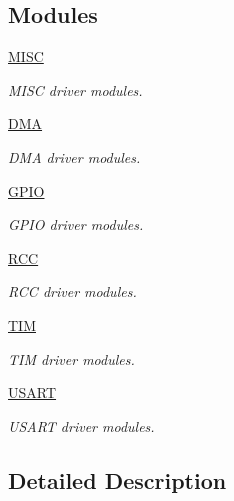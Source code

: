 \subsection*{Modules}
\begin{DoxyCompactItemize}
\item 
\hyperlink{group___m_i_s_c}{M\+I\+SC}
\begin{DoxyCompactList}\small\item\em M\+I\+SC driver modules. \end{DoxyCompactList}\item 
\hyperlink{group___d_m_a}{D\+MA}
\begin{DoxyCompactList}\small\item\em D\+MA driver modules. \end{DoxyCompactList}\item 
\hyperlink{group___g_p_i_o}{G\+P\+IO}
\begin{DoxyCompactList}\small\item\em G\+P\+IO driver modules. \end{DoxyCompactList}\item 
\hyperlink{group___r_c_c}{R\+CC}
\begin{DoxyCompactList}\small\item\em R\+CC driver modules. \end{DoxyCompactList}\item 
\hyperlink{group___t_i_m}{T\+IM}
\begin{DoxyCompactList}\small\item\em T\+IM driver modules. \end{DoxyCompactList}\item 
\hyperlink{group___u_s_a_r_t}{U\+S\+A\+RT}
\begin{DoxyCompactList}\small\item\em U\+S\+A\+RT driver modules. \end{DoxyCompactList}\end{DoxyCompactItemize}


\subsection{Detailed Description}
